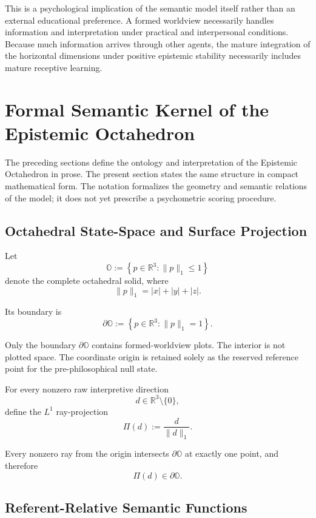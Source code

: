 \documentclass[11pt]{article}
\begin{document}
This is a psychological implication of the semantic model itself rather than an external educational preference. A formed worldview necessarily handles information and interpretation under practical and interpersonal conditions. Because much information arrives through other agents, the mature integration of the horizontal dimensions under positive epistemic stability necessarily includes mature receptive learning.

\section{Formal Semantic Kernel of the Epistemic Octahedron}

The preceding sections define the ontology and interpretation of the Epistemic Octahedron in prose. The present section states the same structure in compact mathematical form. The notation formalizes the geometry and semantic relations of the model; it does not yet prescribe a psychometric scoring procedure.

\subsection{Octahedral State-Space and Surface Projection}

Let
\[
\mathbb O
:=
\left\{
p\in\mathbb R^3:
\|p\|_1\leq1
\right\}
\]
denote the complete octahedral solid, where
\[
\|p\|_1=|x|+|y|+|z|.
\]

Its boundary is
\[
\partial\mathbb O
:=
\left\{
p\in\mathbb R^3:
\|p\|_1=1
\right\}.
\]

Only the boundary $\partial\mathbb O$ contains formed-worldview plots. The interior is not plotted space. The coordinate origin is retained solely as the reserved reference point for the pre-philosophical null state.

For every nonzero raw interpretive direction
\[
d\in\mathbb R^3\setminus\{0\},
\]
define the $L^1$ ray-projection
\[
\boxed{
\Pi(d)
:=
\frac{d}{\|d\|_1}.
}
\]

Every nonzero ray from the origin intersects $\partial\mathbb O$ at exactly one point, and therefore
\[
\Pi(d)\in\partial\mathbb O.
\]

\subsection{Referent-Relative Semantic Functions}
\end{document}
